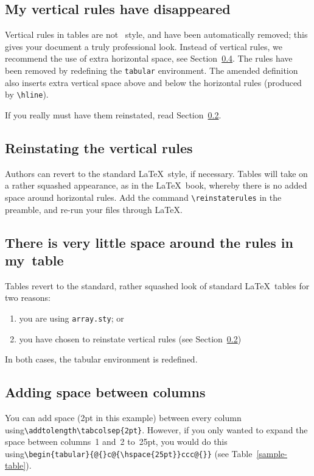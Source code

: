 \subsection{My vertical rules have disappeared}

Vertical rules in tables are not \cambridge\ style, and have been automatically removed; this gives your document a truly professional look. Instead of vertical rules, we recommend the use of extra horizontal space, see Section~\ref{addhoriz}. The rules have been removed by redefining the \verb"tabular" environment. The amended definition also inserts extra vertical space above and below the horizontal rules (produced by \verb"\hline").

If you really must have them reinstated, read Section~\ref{reinstate}.

\subsection{Reinstating the vertical rules}
\label{reinstate}
Authors can revert to the standard \LaTeX\ style, if necessary. Tables will take on a rather squashed appearance, as in the \LaTeX\ book, whereby there is no added space around horizontal rules. Add the command \verb"\reinstaterules" in the preamble, and re-run your files through \LaTeX.

\subsection{There is very little space around the rules in my~table}
Tables revert to the standard, rather squashed look of standard \LaTeX\ tables for two reasons:
\begin{enumerate}
  \item you are using \verb"array.sty"; or
  \item you have chosen to reinstate vertical rules (see Section~\ref{reinstate})
\end{enumerate}
In both cases, the tabular environment is redefined.


\subsection{Adding space between columns}
\label{addhoriz}
You can add space (2pt in this example) between every column using\linebreak \verb"\addtolength\tabcolsep{2pt}". However, if you only wanted to expand the space between columns~1 and~2 to~25pt, you would do this using\linebreak \verb"\begin{tabular}{@{}c@{\hspace{25pt}}ccc@{}}" (see Table~\ref{sample-table}).

